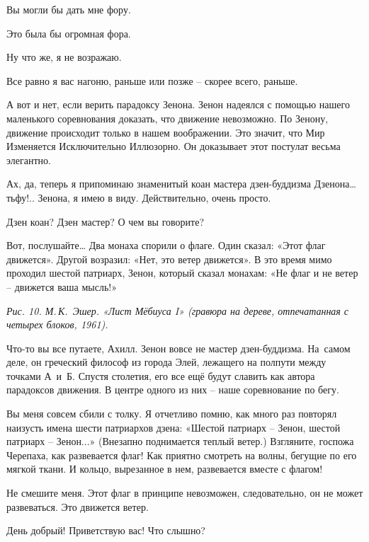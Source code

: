 \documentclass[../main.tex]{subfiles}
\begin{document}
\begin{dialogue}
 Вы могли бы дать мне фору.

 Это была бы огромная фора.

 Ну что же, я не возражаю.

 Все равно я вас нагоню, раньше или позже \--- скорее всего, раньше.

 А вот и нет, если верить парадоксу Зенона. Зенон надеялся с помощью нашего маленького соревнования доказать, что движение невозможно. По Зенону, движение происходит только в нашем воображении. Это значит, что Мир Изменяется Исключительно Иллюзорно. Он доказывает этот постулат весьма элегантно.

 Ах, да, теперь я припоминаю знаменитый коан мастера дзен-буддизма Дзенона\ldots{} тьфу!.. Зенона, я имею в виду. Действительно, очень просто.

 Дзен коан? Дзен мастер? О чем вы говорите?

 Вот, послушайте\ldots{} Два монаха спорили о флаге. Один сказал: «Этот флаг движется». Другой возразил: «Нет, это ветер движется». В это время мимо проходил шестой патриарх, Зенон, который сказал монахам: «Не флаг и не ветер \--- движется ваша мысль!»

\emph{Рис. 10. М.\,К.~Эшер. «Лист Мёбиуса I» (гравюра на дереве, отпечатанная с четырех блоков, 1961).}

 Что-то вы все путаете, Ахилл. Зенон вовсе не мастер дзен-буддизма. На~самом деле, он греческий философ из города Элей, лежащего на полпути между точками А~и~Б. Спустя столетия, его все ещё будут славить как автора парадоксов движения. В центре одного из них \--- наше соревнование по бегу.

 Вы меня совсем сбили с толку. Я отчетливо помню, как много раз повторял наизусть имена шести патриархов дзена: «Шестой патриарх \--- Зенон, шестой патриарх \--- Зенон...» (Внезапно поднимается теплый ветер.) Взгляните, госпожа Черепаха, как развевается флаг! Как приятно смотреть на волны, бегущие по его мягкой ткани. И кольцо, вырезанное в нем, развевается вместе с флагом!

 Не смешите меня. Этот флаг в принципе невозможен, следовательно, он не может развеваться. Это движется ветер.


 День добрый! Приветствую вас! Что слышно?


\end{dialogue}
\end{document}
